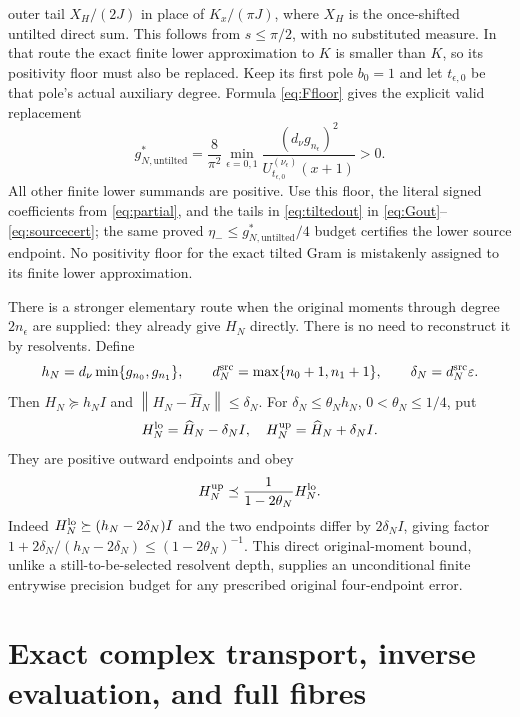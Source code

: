 \documentclass[11pt]{article}
\newcommand{\norm}[1]{\left\lVert#1\right\rVert}
\begin{document}
outer tail $X_H/(2J)$ in place of $K_x/(\pi J)$, where $X_H$
is the once-shifted untilted direct sum. This follows from
$s\le\pi/2$, with no substituted measure. In that route the
exact finite lower approximation to $K$ is smaller than $K$,
so its positivity floor must also be replaced. Keep its first
pole $b_0=1$ and let $t_{\epsilon,0}$ be that pole's actual
auxiliary degree. Formula \eqref{eq:Ffloor} gives the explicit
valid replacement
\[
 g_{N,\mathrm{untilted}}^*
 =\frac8{\pi^2}\min_{\epsilon=0,1}
 \frac{(d_\nu g_{n_\epsilon})^2}
 {U_{t_{\epsilon,0}}^{(\nu_\epsilon)}(x+1)}>0.
\]
All other finite lower summands are positive. Use this floor,
the literal signed coefficients from \eqref{eq:partial}, and
the tails in \eqref{eq:tiltedout} in
\eqref{eq:Gout}--\eqref{eq:sourcecert}; the same proved
$\eta_-\le g_{N,\mathrm{untilted}}^*/4$ budget certifies the
lower source endpoint. No positivity floor for the exact tilted
Gram is mistakenly assigned to its finite lower approximation.

There is a stronger elementary route when the original moments
through degree $2n_\epsilon$ are supplied: they already give
$H_N$ directly. There is no need to reconstruct it by resolvents.
Define
\begin{equation}\label{eq:directconstants}
 h_N=d_\nu\min\{g_{n_0},g_{n_1}\},\qquad
 d_N^{\rm src}=\max\{n_0+1,n_1+1\},\qquad
 \delta_N=d_N^{\rm src}\varepsilon.
\end{equation}
Then $H_N\succeq h_NI$ and $\norm{H_N-\widehat H_N}\le\delta_N$.
For $\delta_N\le\theta_Nh_N$, $0<\theta_N\le1/4$, put
\begin{equation}\label{eq:directout}
 H_N^{\rm lo}=\widehat H_N-\delta_NI,\quad
 H_N^{\rm up}=\widehat H_N+\delta_NI.
\end{equation}
They are positive outward endpoints and obey
\begin{equation}\label{eq:directrelative}
 H_N^{\rm up}\preceq\frac1{1-2\theta_N}H_N^{\rm lo}.
\end{equation}
Indeed $H_N^{\rm lo}\succeq(h_N-2\delta_N)I$ and the two
endpoints differ by $2\delta_NI$, giving factor
$1+2\delta_N/(h_N-2\delta_N)\le(1-2\theta_N)^{-1}$.
This direct original-moment bound, unlike a still-to-be-selected
resolvent depth, supplies an unconditional finite entrywise
precision budget for any prescribed original four-endpoint error.

\section{Exact complex transport, inverse evaluation, and full fibres}
\end{document}
